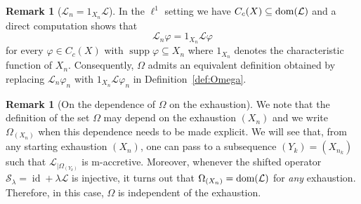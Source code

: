 \documentclass[letterpaper]{article}
\theoremstyle{definition}
\newtheorem{remark}[lemma]{Remark}
\theoremstyle{named}
\numberwithin{equation}{section}
\newcommand{\dom}{\textnormal{dom}} %
\newcommand{\id}{\operatorname{id}}
\newcommand{\Deltaphi}{\mathcal{L}}
\newcommand{\Lmin}{\mathcal{L}_{n}}
\begin{document}
\begin{remark}[$\Lmin  = 1_{X_n} \Deltaphi $]\label{rem:Cutoff_Laplacian}
In the $\ell^1$ setting we have 
$C_c(X) \subseteq \dom(\Deltaphi)$ and a direct computation shows that
$$
\Lmin \varphi = 1_{X_n} \Deltaphi \varphi
$$
for every $\varphi \in C_c(X)$ with $\operatorname{supp}\varphi \subseteq X_n$ where $1_{X_n}$ denotes the characteristic function of $X_n$. Consequently, $\Omega$ admits an equivalent definition obtained by replacing $\Lmin\varphi_n$ with $1_{X_n}\Deltaphi \varphi_n$ in Definition~\ref{def:Omega}.
\end{remark}

\begin{remark}[On the dependence of $\Omega$ on the exhaustion]
We note that the  definition of the set $\Omega$ may depend on the exhaustion $(X_n)$ and we write
$\Omega_{(X_n)}$ when this dependence needs to be made explicit. We will see that, from
any starting exhaustion $(X_n)$, one can pass to a subsequence $(Y_k)=(X_{n_k})$ such that
$\Deltaphi_{\vert \Omega_{(Y_k)}}$ is m-accretive. Moreover, whenever the shifted
operator $\mathcal{S}_\lambda = \id + \lambda \Deltaphi$ is injective, it turns out that
$\Omega_{(X_n)}=\dom(\Deltaphi)$ for \emph{any} exhaustion. Therefore, in this case, $\Omega$ is
independent of the exhaustion.
\end{remark}
\end{document}
